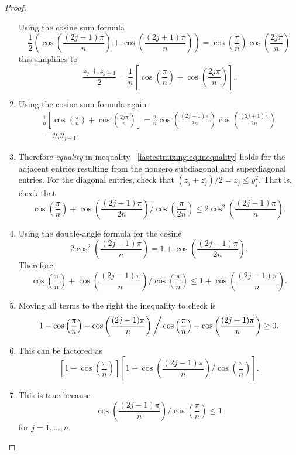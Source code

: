 \documentclass[12pt]{article}
\begin{document}
\begin{proof}
\begin{enumerate}
            Using the cosine sum formula
            \[
                \frac{1}{2} \left( \cos\left( \frac{(2j-1)\pi }{n }
                \right) + \cos\left( \frac{(2j+1)\pi }{n } \right)
                \right) = \cos\left( \frac{\pi}{n} \right) \cos\left(
                \frac{2 j \pi}{n} \right)
            \] this simplifies to
            \[
                \frac{z_j + z_{j+1}}{2} = \frac{1}{n} \left[ \cos\left(
                \frac{\pi} {n} \right) + \cos\left( \frac{2j\pi}{n}
                \right) \right].
            \]
        \item
            Using the cosine sum formula again
            \begin{multline*}
                \frac{1}{n} \left[ \cos\left( \frac{\pi}{n} \right) +
                \cos\left( \frac{2j\pi}{n} \right) \right] = \frac{2}{n}
                \cos\left( \frac{(2j-1) \pi }{2n} \right) \cos\left(
                \frac{(2j+1) \pi }{2n} \right) \\ = y_{j} y_{j+1}.
            \end{multline*}
        \item
            Therefore \emph{equality} in inequality~%
            \eqref{fastestmixing:eq:inequality} holds for the adjacent
            entries resulting from the nonzero subdiagonal and
            superdiagonal entries.  For the diagonal entries, check that
            \( (z_j + z_j)/2 = z_j \le y_j^2 \).  That is, check that
            \[
                \cos\left( \frac{\pi}{n} \right) + \cos\left( \frac{(2j-1)\pi}
                {2n} \right) \bigg/ \cos\left( \frac{\pi}{2n} \right)
                \le 2 \cos^2\left( \frac{(2j-1)\pi}{n} \right).
            \]
        \item
            Using the double-angle formula for the cosine
            \[
                2 \cos^2\left( \frac{(2j-1)\pi}{n} \right) = 1 + \cos\left
                ( \frac{(2j-1)\pi}{2n} \right).
            \] Therefore,
            \[
                \cos\left( \frac{\pi}{n} \right) + \cos\left( \frac{(2j-1)\pi}
                {n} \right) \bigg/ \cos\left( \frac{\pi}{n} \right) \le
                1 + \cos\left( \frac{(2j-1)\pi}{n} \right).
            \]
        \item
            Moving all terms to the right the inequality to check is
            \[
                1 - \cos\left( \frac{\pi}{n} \right) - \cos\left( \frac{%
                (2j-1)\pi} {n} \right) \bigg/ \cos\left( \frac{\pi}{n}
                \right)+ \cos\left( \frac{(2j-1)\pi}{n} \right) \ge 0.
            \]
        \item
            This can be factored as
            \[
                \left[ 1 - \cos\left( \frac{\pi}{n} \right) \right]
                \left[ 1 - \cos\left( \frac{(2j-1)\pi}{n} \right) \bigg/
                \cos\left( \frac{\pi} {n} \right) \right].
            \]
        \item
            This is true because
            \[
                \cos\left(\frac{(2j-1)\pi}{n} \right) \bigg/ \cos\left(
                \frac{\pi} {n} \right) \le 1
            \] for \( j = 1, \dots, n \).
    \end{enumerate}
\end{proof}
\end{document}

